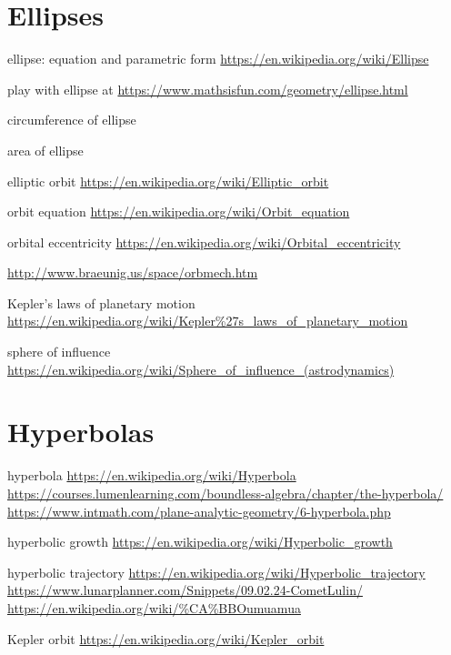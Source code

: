 \documentclass[a4paper,oneside,12pt]{article}
\begin{document}

\section{Ellipses}

{\color{red}
\begin{packeditem}
\item ellipse: equation and parametric form
  \url{https://en.wikipedia.org/wiki/Ellipse}

\item play with ellipse at
  \url{https://www.mathsisfun.com/geometry/ellipse.html}

\item circumference of ellipse

\item area of ellipse

\item elliptic orbit
  \url{https://en.wikipedia.org/wiki/Elliptic_orbit}

\item orbit equation
  \url{https://en.wikipedia.org/wiki/Orbit_equation}

\item orbital eccentricity
  \url{https://en.wikipedia.org/wiki/Orbital_eccentricity}

\item \url{http://www.braeunig.us/space/orbmech.htm}

\item Kepler's laws of planetary motion
  \url{https://en.wikipedia.org/wiki/Kepler\%27s_laws_of_planetary_motion}

\item sphere of influence
  \url{https://en.wikipedia.org/wiki/Sphere_of_influence_(astrodynamics)}
\end{packeditem}
}



\section{Hyperbolas}

{\color{red}
\begin{packeditem}
\item hyperbola
  \url{https://en.wikipedia.org/wiki/Hyperbola}
  \url{https://courses.lumenlearning.com/boundless-algebra/chapter/the-hyperbola/}
  \url{https://www.intmath.com/plane-analytic-geometry/6-hyperbola.php}

\item hyperbolic growth
  \url{https://en.wikipedia.org/wiki/Hyperbolic_growth}

\item hyperbolic trajectory
  \url{https://en.wikipedia.org/wiki/Hyperbolic_trajectory}
  \url{https://www.lunarplanner.com/Snippets/09.02.24-CometLulin/}
  \url{https://en.wikipedia.org/wiki/\%CA\%BBOumuamua}

\item Kepler orbit
  \url{https://en.wikipedia.org/wiki/Kepler_orbit}
\end{packeditem}
}
\end{document}
